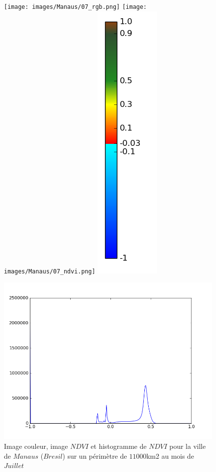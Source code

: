 \documentclass{book}
\begin{document}
\begin{figure}[H]
\centerline{
\texttt{[image: images/Manaus/07\_rgb.png]}
\texttt{[image: images/Manaus/07\_ndvi.png]}
\includegraphics[scale=0.4]{images/colormap.png}
}
\begin{center}
\includegraphics[scale=0.45]{images/Manaus/07_ndvi_histo.png}
\end{center}
\caption{Image couleur, image $NDVI$ et histogramme de $NDVI$ pour la ville de $Manaus$ ($Bresil$) sur un périmètre de $11000$km2 au mois de $Juillet$}
\label{manaus_ndvi}
\end{figure}
\end{document}
